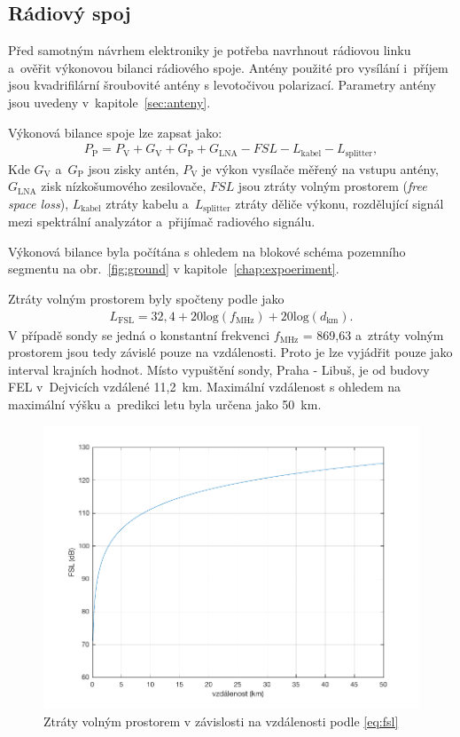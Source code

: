 \documentclass[twoside]{ctuthesis}
\newcommand{\mt}[1]{\text{#1}}
\theoremstyle{plain}
\theoremstyle{definition}
\theoremstyle{note}
\begin{document}
		\subsection{Rádiový spoj}
		Před samotným návrhem elektroniky je potřeba navrhnout rádiovou linku a~ověřit výkonovou bilanci rádiového spoje. Antény použité pro vysílání i~příjem jsou kvadrifilární šroubovité antény s levotočivou polarizací. Parametry antény jsou uvedeny v~kapitole~\ref{sec:anteny}.

		Výkonová bilance spoje lze zapsat jako:
		\begin{align}
			P_\mt{P} = P_\mt{V} + G_\mt{V} + G_\mt{P} + G_\mt{LNA} - FSL - L_\mt{kabel} - L_\mt{splitter},
			\label{eq:bilance}
		\end{align}
		Kde $G_\mt{V}$ a~$G_\mt{P}$ jsou zisky antén, $P_\mt{V}$ je výkon vysílače měřený na vstupu antény, $G_\mt{LNA}$ zisk nízkošumového zesilovače, $FSL$ jsou ztráty volným prostorem (\textit{free space loss}), $L_\mt{kabel}$ ztráty kabelu a~$L_\mt{splitter}$ ztráty děliče výkonu, rozdělující signál mezi spektrální analyzátor a~přijímač radiového signálu.

		Výkonová bilance byla počítána s ohledem na blokové schéma pozemního segmentu na obr.~\ref{fig:ground} v kapitole~\ref{chap:expoeriment}.

		Ztráty volným prostorem byly spočteny podle \cite{zaklady:sireni:vln} jako
		\begin{align}
			L_\mt{FSL} = 32,4 + 20\mt{log}(f_\mt{MHz}) + 20\mt{log}(d_\mt{km}).
			\label{eq:fsl}
		\end{align}
		V případě sondy se jedná o konstantní frekvenci $f_\mt{MHz}$ = 869{,}63 a~ztráty volným prostorem jsou tedy závislé pouze na vzdálenosti. Proto je lze vyjádřit pouze jako interval krajních hodnot. Místo vypuštění sondy, Praha - Libuš, je od budovy FEL v~Dejvicích vzdálené 11,2~km. Maximální vzdálenost s ohledem na maximální výšku a~predikci letu byla určena jako 50~km.
		\begin{figure}
			\centering
			\includegraphics[width = .6\textwidth]{Graphs/FSL.pdf}
			\caption{Ztráty volným prostorem v závislosti na vzdálenosti podle \eqref{eq:fsl}}
		\end{figure}
\end{document}
